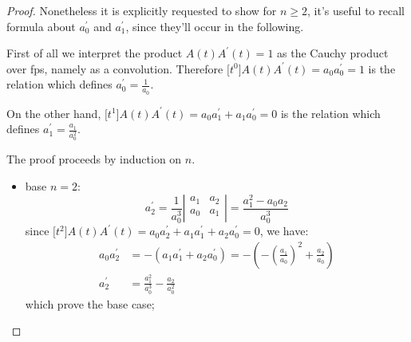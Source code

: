 \documentclass[11pt,a4paper]{article} %
\begin{document}
    \begin{proof}
    Nonetheless it is explicitly requested to show for $n\geq2$, it's useful
    to recall formula about $a_{0}^{\prime}$ and $a_{1}^{\prime}$, since
    they'll occur in the following. 
    
    First of all we interpret the product
    $A(t)A^{\prime}(t)=1$ as the Cauchy product over fps, namely as a convolution.
    Therefore $\big[t^{0}\big]A(t)A^{\prime}(t)=a_{0}a_{0}^{\prime}=1$ is
    the relation which defines $a_{0}^{\prime}=\frac{1}{a_0}$.

    On the other hand, $\big[t^{1}\big]A(t)A^{\prime}(t)=a_{0}a_{1}^{\prime}+a_{1}a_{0}^{\prime}=0$
    is the relation which defines $a_{1}^{\prime}=\frac{a_1}{a_{0}^{2}}$.

    The proof proceeds by induction on $n$.
    \begin{itemize}
        \item base $n=2$:
            \begin{displaymath}                
                a_{2}^{\prime} = \frac{1}{a_{0}^{3}}
                    \left|
                    \begin{array}{cc}
                        a_1 & a_2 \\
                        a_0 & a_1 \\
                    \end{array}
                    \right| 
                    = \frac{a_{1}^{2}-a_{0}a_{2}}{a_{0}^{3}}
            \end{displaymath}                
            since $\big[t^{2}\big]A(t)A^{\prime}(t)=a_{0}a_{2}^{\prime}
                +a_{1}a_{1}^{\prime}+a_{2}a_{0}^{\prime}=0$, we have:
                \begin{displaymath}
                    \begin{split}
                        a_{0}a_{2}^{\prime} &= -\left(a_{1}a_{1}^{\prime}+a_{2}a_{0}^{\prime}\right)
                            = -\left(-\left(\frac{a_{1}}{a_{0}}\right)^{2}+\frac{a_{2}}{a_{0}}\right)\\
                        a_{2}^{\prime} &= \frac{a_{1}^{2}}{a_{0}^{3}}-\frac{a_{2}}{a_{0}^{2}}
                    \end{split}
                \end{displaymath}
            which prove the base case;


\end{itemize}
\end{proof}
\end{document}

